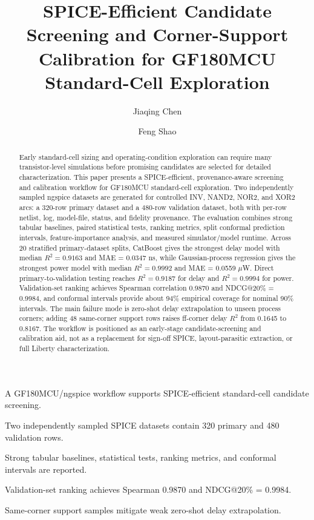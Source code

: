 \documentclass[preprint,12pt]{elsarticle}
\begin{document}
\begin{frontmatter}

\title{SPICE-Efficient Candidate Screening and Corner-Support Calibration for GF180MCU Standard-Cell Exploration}

\author[aff1]{Jiaqing Chen}

\author[aff1]{Feng Shao}


\begin{abstract}
Early standard-cell sizing and operating-condition exploration can require many transistor-level simulations before promising candidates are selected for detailed characterization. This paper presents a SPICE-efficient, provenance-aware screening and calibration workflow for GF180MCU standard-cell exploration. Two independently sampled ngspice datasets are generated for controlled INV, NAND2, NOR2, and XOR2 arcs: a 320-row primary dataset and a 480-row validation dataset, both with per-row netlist, log, model-file, status, and fidelity provenance. The evaluation combines strong tabular baselines, paired statistical tests, ranking metrics, split conformal prediction intervals, feature-importance analysis, and measured simulator/model runtime. Across 20 stratified primary-dataset splits, CatBoost gives the strongest delay model with median $R^2=0.9163$ and MAE = 0.0347 ns, while Gaussian-process regression gives the strongest power model with median $R^2=0.9992$ and MAE = 0.0559 $\mu$W. Direct primary-to-validation testing reaches $R^2=0.9187$ for delay and $R^2=0.9994$ for power. Validation-set ranking achieves Spearman correlation 0.9870 and NDCG@20\% = 0.9984, and conformal intervals provide about 94\% empirical coverage for nominal 90\% intervals. The main failure mode is zero-shot delay extrapolation to unseen process corners; adding 48 same-corner support rows raises ff-corner delay $R^2$ from 0.1645 to 0.8167. The workflow is positioned as an early-stage candidate-screening and calibration aid, not as a replacement for sign-off SPICE, layout-parasitic extraction, or full Liberty characterization.
\end{abstract}

\begin{highlights}
\item A GF180MCU/ngspice workflow supports SPICE-efficient standard-cell candidate screening.
\item Two independently sampled SPICE datasets contain 320 primary and 480 validation rows.
\item Strong tabular baselines, statistical tests, ranking metrics, and conformal intervals are reported.
\item Validation-set ranking achieves Spearman 0.9870 and NDCG@20\% = 0.9984.
\item Same-corner support samples mitigate weak zero-shot delay extrapolation.
\end{highlights}


\end{frontmatter}
\end{document}
